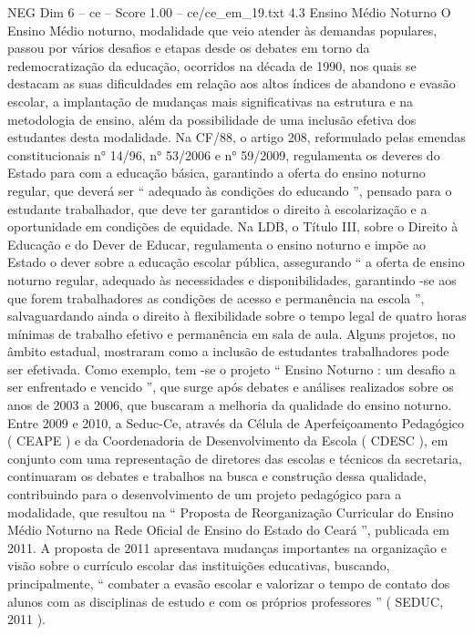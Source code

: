 \begin{textsample}{NEG Dim 6 – ce – Score 1.00 – ce/ce\_em\_19.txt}  \label{ex:f6_neg_257}
4.3 Ensino Médio Noturno O Ensino Médio noturno, modalidade que veio atender às demandas populares, passou por vários desafios e etapas desde os debates em torno da redemocratização da educação, ocorridos na década de 1990, nos quais se destacam as suas dificuldades em relação aos altos índices de abandono e evasão escolar, a implantação de mudanças mais significativas na estrutura e na metodologia de ensino, além da possibilidade de uma inclusão efetiva dos estudantes desta modalidade.
Na CF/88, o artigo 208, reformulado pelas emendas constitucionais n{\EmojiFont °} 14/96, n{\EmojiFont °} 53/2006 e n{\EmojiFont °} 59/2009, regulamenta os deveres do Estado para com a educação básica, garantindo a oferta do ensino noturno regular, que deverá ser “ adequado às condições do educando ”, pensado para o estudante trabalhador, que deve ter garantidos o direito à escolarização e a oportunidade em condições de equidade.
Na LDB, o Título III, sobre o Direito à Educação e do Dever de Educar, regulamenta o ensino noturno e impõe ao Estado o dever sobre a educação escolar pública, assegurando “ a oferta de ensino noturno regular, adequado às necessidades e disponibilidades, garantindo -se aos que forem trabalhadores as condições de acesso e permanência na escola ”, salvaguardando ainda o direito à flexibilidade sobre o tempo legal de quatro horas mínimas de trabalho efetivo e permanência em sala de aula.
Alguns projetos, no âmbito estadual, mostraram como a inclusão de estudantes trabalhadores pode ser efetivada.
Como exemplo, tem -se o projeto “ Ensino Noturno : um desafio a ser enfrentado e vencido ”, que surge após debates e análises realizados sobre os anos de 2003 a 2006, que buscaram a melhoria da qualidade do ensino noturno.
Entre 2009 e 2010, a Seduc-Ce, através da Célula de Aperfeiçoamento Pedagógico ( CEAPE ) e da Coordenadoria de Desenvolvimento da Escola ( CDESC ), em conjunto com uma representação de diretores das escolas e técnicos da secretaria, continuaram os debates e trabalhos na busca e construção dessa qualidade, contribuindo para o desenvolvimento de um projeto pedagógico para a modalidade, que resultou na “ Proposta de Reorganização Curricular do Ensino Médio Noturno na Rede Oficial de Ensino do Estado do Ceará ”, publicada em 2011.
A proposta de 2011 apresentava mudanças importantes na organização e visão sobre o currículo escolar das instituições educativas, buscando, principalmente, “ combater a evasão escolar e valorizar o tempo de contato dos alunos com as disciplinas de estudo e com os próprios professores ” ( SEDUC, 2011 ).

\end{textsample}
